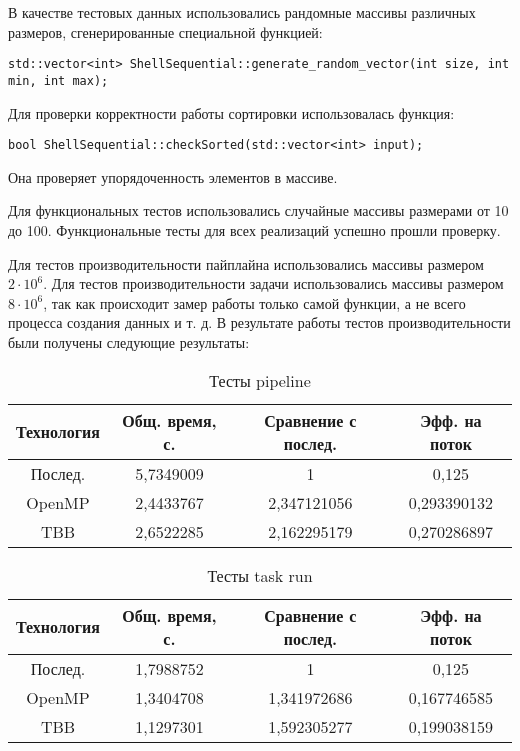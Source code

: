 \documentclass[]{article}
\theoremstyle{remark}
\theoremstyle{definition}
\begin{document}
\par В качестве тестовых данных использовались рандомные массивы различных размеров, сгенерированные специальной функцией:
\begin{verbatim}
std::vector<int> ShellSequential::generate_random_vector(int size, int min, int max);
\end{verbatim}

\par Для проверки корректности работы сортировки использовалась функция:

\begin{verbatim}
bool ShellSequential::checkSorted(std::vector<int> input);
\end{verbatim}

\par Она проверяет упорядоченность элементов в массиве.

\par Для функциональных тестов использовались случайные массивы размерами от 10 до 100. Функциональные тесты для всех реализаций успешно прошли проверку.

\par Для тестов производительности пайплайна использовались массивы размером $2 \cdot 10^6$. Для тестов производительности задачи использовались массивы размером $8 \cdot 10^6$, так как происходит замер работы только самой функции, а не всего процесса создания данных и т. д. В результате работы тестов производительности были получены следующие результаты:

\begin{table}[h!]
    \begin{center}
        \begin{tabular}{ |c|c|c|c| } 
        \hline
        Технология & Общ. время, с. & Сравнение с послед. & Эфф. на поток  \\
        \hline
        Послед. & 5,7349009 & 1 & 0,125 \\
        OpenMP & 2,4433767 & 2,347121056 & 0,293390132 \\
        TBB & 2,6522285 & 2,162295179 & 0,270286897 \\
        \hline
        \end{tabular}
    \end{center}
    \caption{Тесты pipeline}
\end{table}

\begin{table}[h]
    \begin{center}
        \begin{tabular}{ |c|c|c|c| } 
        \hline
        Технология & Общ. время, с. & Сравнение с послед. & Эфф. на поток  \\
        \hline
        Послед. & 1,7988752 & 1 & 0,125 \\
        OpenMP & 1,3404708 & 1,341972686 & 0,167746585 \\
        TBB & 1,1297301 & 1,592305277 & 0,199038159 \\
        \hline
        \end{tabular}
    \end{center}
    \caption{Тесты task run}
\end{table}
\end{document}
